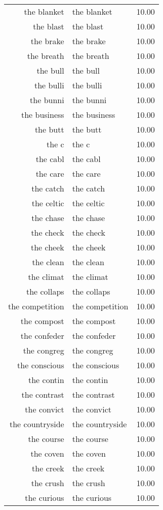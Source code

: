 \begin{table}[ht]
\begin{tabular}{rlr}
  the blanket & the blanket & 10.00 \\ 
  the blast & the blast & 10.00 \\ 
  the brake & the brake & 10.00 \\ 
  the breath & the breath & 10.00 \\ 
  the bull & the bull & 10.00 \\ 
  the bulli & the bulli & 10.00 \\ 
  the bunni & the bunni & 10.00 \\ 
  the business & the business & 10.00 \\ 
  the butt & the butt & 10.00 \\ 
  the c & the c & 10.00 \\ 
  the cabl & the cabl & 10.00 \\ 
  the care & the care & 10.00 \\ 
  the catch & the catch & 10.00 \\ 
  the celtic & the celtic & 10.00 \\ 
  the chase & the chase & 10.00 \\ 
  the check & the check & 10.00 \\ 
  the cheek & the cheek & 10.00 \\ 
  the clean & the clean & 10.00 \\ 
  the climat & the climat & 10.00 \\ 
  the collaps & the collaps & 10.00 \\ 
  the competition & the competition & 10.00 \\ 
  the compost & the compost & 10.00 \\ 
  the confeder & the confeder & 10.00 \\ 
  the congreg & the congreg & 10.00 \\ 
  the conscious & the conscious & 10.00 \\ 
  the contin & the contin & 10.00 \\ 
  the contrast & the contrast & 10.00 \\ 
  the convict & the convict & 10.00 \\ 
  the countryside & the countryside & 10.00 \\ 
  the course & the course & 10.00 \\ 
  the coven & the coven & 10.00 \\ 
  the creek & the creek & 10.00 \\ 
  the crush & the crush & 10.00 \\ 
  the curious & the curious & 10.00 \\ 

\end{tabular}
\end{table}
